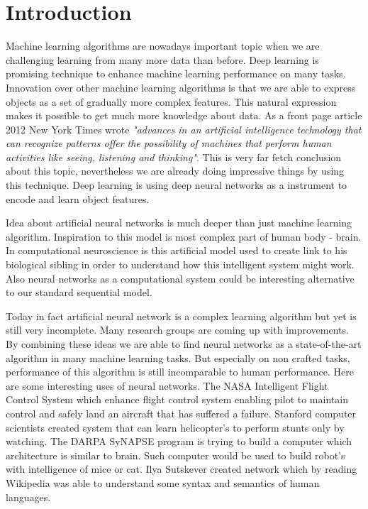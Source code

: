 \chapter{Introduction}
Machine learning algorithms are nowadays important topic when we are challenging learning from many more data than before. Deep learning is promising technique to enhance machine learning performance on many tasks. Innovation over other machine learning algorithms is that we are able to express objects as a set of gradually more complex features. This natural expression makes it possible to get much more knowledge about data. As a front page article 2012 New York Times wrote \textit{"advances in an artificial intelligence technology that can recognize patterns offer the possibility of machines that perform human activities like seeing, listening and thinking"}. This is very far fetch conclusion about this topic, nevertheless we are already doing impressive things by using this technique. Deep learning is using deep neural networks as a instrument to encode and learn object features.

Idea about artificial neural networks is much deeper than just machine learning algorithm. Inspiration to this model is most complex part of human body - brain. In computational neuroscience is this artificial model used to create link to his biological sibling in order to understand how this intelligent system might work. Also neural networks as a computational system could be interesting alternative to our standard sequential model.

Today in fact artificial neural network is a complex learning algorithm but yet is still very incomplete. Many research groups are coming up with improvements. By combining these ideas we are able to find neural networks as a state-of-the-art algorithm in many machine learning tasks. But especially on non crafted tasks, performance of this algorithm is still incomparable to human performance. Here are some interesting uses of neural networks. The NASA Intelligent Flight Control System which enhance flight control system enabling pilot to maintain control and safely land an aircraft that has suffered a failure. Stanford computer scientists created system that can learn helicopter's to perform stunts only by watching. The DARPA SyNAPSE program is trying to build a computer which architecture is similar to brain. Such computer would be used to build robot's with intelligence of mice or cat. Ilya Sutskever created network which by reading Wikipedia was able to understand some syntax and semantics of human languages.

